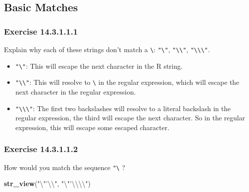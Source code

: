\documentclass[]{book}
\newenvironment{Shaded}{\begin{snugshade}}{\end{snugshade}}
\newcommand{\CharTok}[1]{\textcolor[rgb]{0.31,0.60,0.02}{#1}}
\newcommand{\KeywordTok}[1]{\textcolor[rgb]{0.13,0.29,0.53}{\textbf{#1}}}
\newcommand{\NormalTok}[1]{#1}
\newcommand{\StringTok}[1]{\textcolor[rgb]{0.31,0.60,0.02}{#1}}
\providecommand{\tightlist}{%
  \setlength{\itemsep}{0pt}\setlength{\parskip}{0pt}}
\theoremstyle{plain}
\theoremstyle{remark}
\begin{document}
\hypertarget{basic-matches}{%
\subsection{Basic Matches}\label{basic-matches}}

\hypertarget{exercise-14.3.1.1.1}{%
\subsubsection*{\texorpdfstring{Exercise
{14.3.1.1.1}}{Exercise 14.3.1.1.1}}\label{exercise-14.3.1.1.1}}

Explain why each of these strings don't match a
\texttt{\textbackslash{}}: \texttt{"\textbackslash{}"},
\texttt{"\textbackslash{}\textbackslash{}"},
\texttt{"\textbackslash{}\textbackslash{}\textbackslash{}"}.

\begin{itemize}
\tightlist
\item
  \texttt{"\textbackslash{}"}: This will escape the next character in
  the R string.
\item
  \texttt{"\textbackslash{}\textbackslash{}"}: This will resolve to
  \texttt{\textbackslash{}} in the regular expression, which will escape
  the next character in the regular expression.
\item
  \texttt{"\textbackslash{}\textbackslash{}\textbackslash{}"}: The first
  two backslashes will resolve to a literal backslash in the regular
  expression, the third will escape the next character. So in the
  regular expression, this will escape some escaped character.
\end{itemize}

\hypertarget{exercise-14.3.1.1.2}{%
\subsubsection*{\texorpdfstring{Exercise
{14.3.1.1.2}}{Exercise 14.3.1.1.2}}\label{exercise-14.3.1.1.2}}

How would you match the sequence
\texttt{"\textquotesingle{}\textbackslash{}} ?

\begin{Shaded}
\begin{Highlighting}[]
\KeywordTok{str_view}\NormalTok{(}\StringTok{"}\CharTok{\textbackslash{}"}\StringTok{'}\CharTok{\textbackslash{}\textbackslash{}}\StringTok{"}\NormalTok{, }\StringTok{"}\CharTok{\textbackslash{}"}\StringTok{'}\CharTok{\textbackslash{}\textbackslash{}\textbackslash{}\textbackslash{}}\StringTok{"}\NormalTok{)}
\end{Highlighting}
\end{Shaded}
\end{document}
